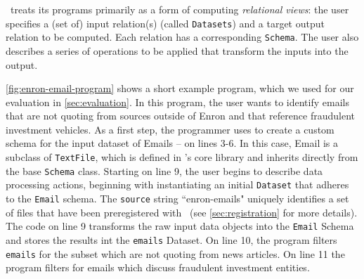 


\system\ treats its programs primarily as a form of computing {\em relational views}: the user specifies a (set of) input relation(s) (called {\tt Datasets}) and a target output relation to be computed. Each relation has a corresponding {\tt Schema}. The user also describes a series of operations to be applied that transform the inputs into the output.

\autoref{fig:enron-email-program} shows a short example program, which we used for our evaluation in \autoref{sec:evaluation}. In this program, the user wants to identify emails that are not quoting from sources outside of Enron and that reference fraudulent investment vehicles. As a first step, the programmer uses \system{} to create a custom schema for the input dataset of Emails -- on lines 3-6.
In this case, Email is a subclass of {\tt TextFile}, which is defined in \system{}'s core library and inherits directly from the base {\tt Schema} class.  Starting on line 9, the user begins to describe data processing actions, beginning with instantiating an initial {\tt Dataset} that adheres to the {\tt Email} schema. The {\tt source} string ``enron-emails" uniquely identifies a set of files that have been preregistered with \system\ (see \autoref{sec:registration} for more details). The code on line 9 transforms the raw input data objects into the {\tt Email} Schema and stores the results int the {\tt emails} Dataset. On line 10, the program filters {\tt emails} for the subset which are not quoting from news articles. On line 11 the program filters for emails which discuss fraudulent investment entities.


